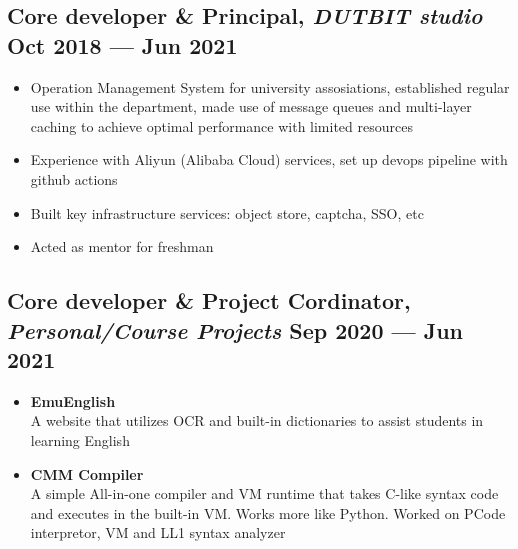 \documentclass[a4,10pt]{article}
\newenvironment{zitemize}{
\begin{itemize}\itemsep0pt \parskip0pt \parsep1pt}
{\end{itemize}\vspace{-0.5cm}}
\begin{document}


\subsection*{Core developer \& Principal, {\normalsize\normalfont \textit{DUTBIT studio}} \hfill  Oct 2018 --- Jun 2021} 
    \begin{zitemize}
        \item Operation Management System for university assosiations, established regular use within the department, made use of message queues and multi-layer caching to achieve optimal performance with limited resources
        \item Experience with Aliyun (Alibaba Cloud) services, set up devops pipeline with github actions
        \item Built key infrastructure services: object store, captcha, SSO, etc
        \item Acted as mentor for freshman
    \end{zitemize}


\subsection*{Core developer \& Project Cordinator, {\normalsize\normalfont \textit{Personal/Course Projects}} \hfill Sep 2020 --- Jun 2021} 
    \begin{zitemize}
        \item \textbf{EmuEnglish}\\ A website that utilizes OCR and built-in dictionaries to assist students in learning English
        \item \textbf{CMM Compiler}\\ A simple All-in-one compiler and VM runtime that takes C-like syntax code and executes in the built-in VM. Works more like Python. Worked on PCode interpretor, VM and LL1 syntax analyzer
    \end{zitemize}
\end{document}

